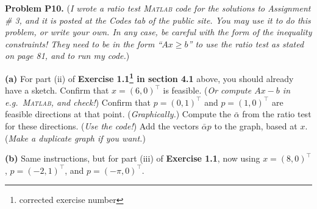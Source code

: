 \documentclass[12pt]{amsart}
\newcommand{\Matlab}{\textsc{Matlab}\xspace}
\newcommand{\prob}[1]{\bigskip\noindent\textbf{#1}\quad }
\newcommand{\epart}[1]{\medskip\noindent\textbf{(#1)}\quad }
\begin{document}
\prob{Problem P10.}  (\emph{I wrote a ratio test \Matlab code for the solutions to Assignment \# 3, and it is posted at the Codes tab of the public site.  You may use it to do this problem, or write your own.  In any case, be careful with the form of the inequality constraints!  They need to be in the form ``$Ax\ge b$'' to use the ratio test as stated on page 81, and to run my code.})

\epart{a}  For part (ii) of {\color{BrickRed}\textbf{Exercise 1.1\footnote{{\color{BrickRed} corrected exercise number}} in section 4.1}} above, you should already have a sketch.  Confirm that $x=(6,0)^\top$ is feasible.  (\emph{Or compute $Ax-b$ in e.g.~\Matlab, and check!}) Confirm that $p=(0,1)^\top$ and $p=(1,0)^\top$ are feasible directions at that point.  (\emph{Graphically.})  Compute the $\bar \alpha$ from the ratio test for these directions.  (\emph{Use the code!})  Add the vectors $\bar \alpha p$ to the graph, based at $x$.  (\emph{Make a duplicate graph if you want.})

\epart{b}  Same instructions, but for part (iii) of {\color{BrickRed}\textbf{Exercise 1.1}}, now using $x=(8,0)^\top$, $p=(-2,1)^\top$, and $p=(-\pi,0)^\top$.
\end{document}
